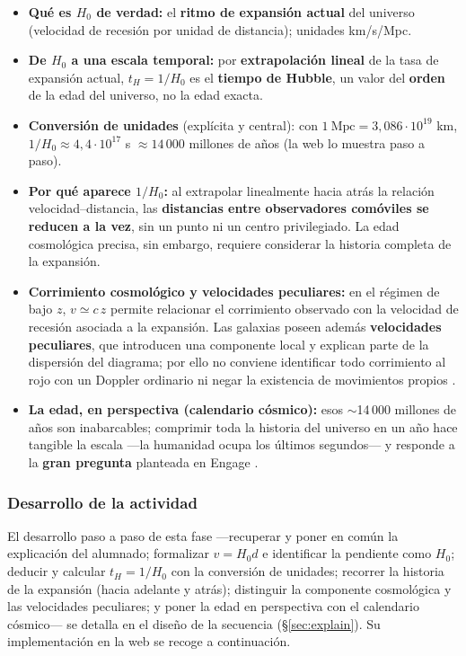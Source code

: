 \begin{itemize}
\item \textbf{Qué es $H_{0}$ de verdad:} el \textbf{ritmo de expansión actual} del universo (velocidad de recesión por unidad de distancia); unidades km/s/Mpc.
\item \textbf{De $H_{0}$ a una escala temporal:} por \textbf{extrapolación lineal} de la tasa de expansión actual, $t_H=1/H_{0}$ es el \textbf{tiempo de Hubble}, un valor del \textbf{orden} de la edad del universo, no la edad exacta.
\item \textbf{Conversión de unidades} (explícita y central): con $1\ \text{Mpc} = 3{,}086\cdot10^{19}$ km, $1/H_{0} \approx 4{,}4\cdot10^{17}$ s $\approx 14\,000$ millones de años (la web lo muestra paso a paso).
\item \textbf{Por qué aparece $1/H_{0}$:} al extrapolar linealmente hacia atrás la relación velocidad--distancia, las \textbf{distancias entre observadores comóviles se reducen a la vez}, sin un punto ni un centro privilegiado. La edad cosmológica precisa, sin embargo, requiere considerar la historia completa de la expansión.
\item \textbf{Corrimiento cosmológico y velocidades peculiares:} en el régimen de bajo $z$, $v\simeq c\,z$ permite relacionar el corrimiento observado con la velocidad de recesión asociada a la expansión. Las galaxias poseen además \textbf{velocidades peculiares}, que introducen una componente local y explican parte de la dispersión del diagrama; por ello no conviene identificar todo corrimiento al rojo con un Doppler ordinario ni negar la existencia de movimientos propios \parencite{xu2018,possel2020,marshall2022}.
\item \textbf{La edad, en perspectiva (calendario cósmico):} esos $\sim$14\,000 millones de años son inabarcables; comprimir toda la historia del universo en un año hace tangible la escala ---la humanidad ocupa los últimos segundos--- y responde a la \textbf{gran pregunta} planteada en Engage \parencite{colantonio2019}.
\end{itemize}

\subsubsection*{Desarrollo de la actividad}

El desarrollo paso a paso de esta fase ---recuperar y poner en común la explicación del alumnado; formalizar $v = H_{0}d$ e identificar la pendiente como $H_{0}$; deducir y calcular $t_H = 1/H_{0}$ con la conversión de unidades; recorrer la historia de la expansión (hacia adelante y atrás); distinguir la componente cosmológica y las velocidades peculiares; y poner la edad en perspectiva con el calendario cósmico--- se detalla en el diseño de la secuencia (§\ref{sec:explain}). Su implementación en la web se recoge a continuación.


